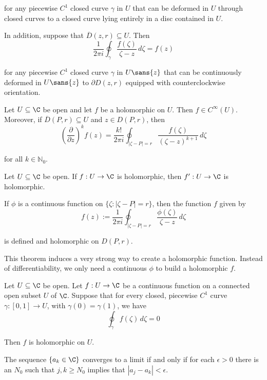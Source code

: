 for any piecewise $C^1$ closed curve $\gamma$ in $U$ that can be deformed in
$U$ through closed curves to a closed curve lying entirely in a disc contained
in $U$.

In addition, suppose that $\overline D(z,r)\subseteq U$. Then
$$
  \frac1{2\pi i}\oint_\gamma\frac{f(\zeta)}{\zeta-z}\,d\zeta=f(z)
$$

for any piecewise $C^1$ closed curve $\gamma$ in $U\sans{z}$ that can be
continuously deformed in $U\sans{z}$ to $\partial D(z,r)$ equipped with
counterclockwise orientation.

\label{e20a4ed}

Let $U\subseteq\C$ be open and let $f$ be a holomorphic on $U$. Then $f\in
C^\infty(U)$. Moreover, if $\overline D(P,r)\subseteq U$ and $z\in D(P,r)$,
then
$$
  \left(\frac\partial{\partial z}\right)^kf(z)=\frac{k!}{2\pi i}
  \oint_{|\zeta-P|=r}\frac{f(\zeta)}{(\zeta-z)^{k+1}}\,d\zeta
$$

for all $k\in\mathbb{N}_0$.

\label{ee189cf}

Let $U\subseteq\C$ be open. If $f:U\to\C$ is holomorphic, then $f':U\to\C$ is
holomorphic.

\label{c056da0}

If $\phi$ is a continuous function on $\{\zeta:|\zeta-P|=r\}$, then the
function $f$ given by
$$
  f(z):=\frac1{2\pi i}\oint_{|\zeta-P|=r}\frac{\phi(\zeta)}{\zeta-z}\,d\zeta
$$

is defined and holomorphic on $D(P,r)$.

This theorem induces a very strong way to create a holomorphic function.
Instead of differentiability, we only need a continuous $\phi$ to build a
holomorphic $f$.

\label{f378992}

Let $U\subseteq\C$ be open. Let $f:U\to\C$ be a continuous function on a
connected open subset $U$ of $\C$. Suppose that for every closed, piecewise
$C^1$ curve $\gamma:[0,1]\to U$, with $\gamma(0)=\gamma(1)$, we have
$$\oint_\gamma f(\zeta)\,d\zeta=0$$

Then $f$ is holomorphic on $U$.

\label{db44655}

The sequence $\{a_k\in\C\}$ converges to a limit if and only if for each
$\epsilon>0$ there is an $N_0$ such that $j,k\geq N_0$ implies that
$|a_j-a_k|<\epsilon$.

